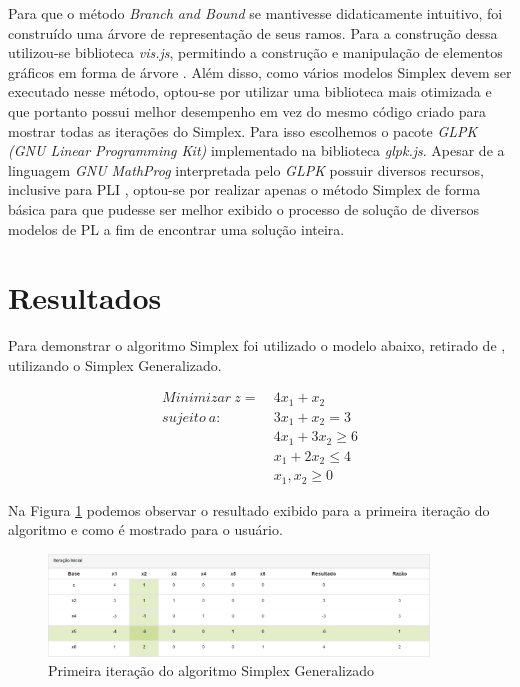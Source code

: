 \documentclass [11pt]{articleSBPO}
\begin{document}
Para que o método \textit{Branch and Bound} se mantivesse didaticamente intuitivo, foi construído uma árvore de representação de seus ramos. Para a construção dessa utilizou-se biblioteca \textit{vis.js}, permitindo a construção e manipulação de elementos gráficos em forma de árvore \cite{vis}. Além disso, como vários modelos Simplex devem ser executado nesse método, optou-se por utilizar uma biblioteca mais otimizada e que portanto possui melhor desempenho em vez do mesmo código criado para mostrar todas as iterações do Simplex. Para isso escolhemos o pacote \textit{GLPK (GNU Linear Programming Kit)} implementado na biblioteca \textit{glpk.js}. Apesar de a linguagem \textit{GNU MathProg} interpretada pelo \textit{GLPK} possuir diversos recursos, inclusive para PLI \cite{mathprog}, optou-se por realizar apenas o método Simplex de forma básica para que pudesse ser melhor exibido o processo de solução de diversos modelos de PL a fim de encontrar uma solução inteira.

\section{Resultados}\label{sec:resultados}



Para demonstrar o algoritmo Simplex foi utilizado o modelo abaixo, retirado de \cite{taha}, utilizando o Simplex Generalizado.

\begin{equation*}
	\begin{split}
		Minimizar\ z =\ & 4x_{1} + x_{2} \\
		sujeito\ a:\ \ \ \ &  3x_{1} + x_{2} = 3 \\
		& 4x_{1} + 3x_{2} \geq 6 \\
		& x_{1} + 2x_{2} \leq 4 \\
		& x_{1}, x_{2} \geq 0
	\end{split}
\end{equation*}

Na Figura \ref{fig:simplexit1} podemos observar o resultado exibido para a primeira iteração do algoritmo e como é mostrado para o usuário.

\begin{figure}[!h]
	\centering
	\includegraphics[width=0.9\textwidth]{img/simplexit1.png}
	\caption[]{Primeira iteração do algoritmo Simplex Generalizado}
	\label{fig:simplexit1}
\end{figure}
\end{document}
